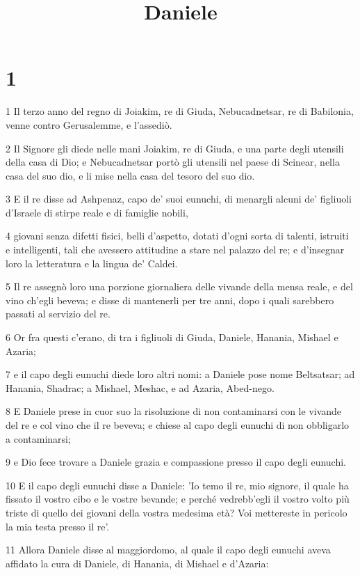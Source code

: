 

\title{Daniele}


\chapter{1}

\par 1 Il terzo anno del regno di Joiakim, re di Giuda, Nebucadnetsar, re di Babilonia, venne contro Gerusalemme, e l'assediò.
\par 2 Il Signore gli diede nelle mani Joiakim, re di Giuda, e una parte degli utensili della casa di Dio; e Nebucadnetsar portò gli utensili nel paese di Scinear, nella casa del suo dio, e li mise nella casa del tesoro del suo dio.
\par 3 E il re disse ad Ashpenaz, capo de' suoi eunuchi, di menargli alcuni de' figliuoli d'Israele di stirpe reale e di famiglie nobili,
\par 4 giovani senza difetti fisici, belli d'aspetto, dotati d'ogni sorta di talenti, istruiti e intelligenti, tali che avessero attitudine a stare nel palazzo del re; e d'insegnar loro la letteratura e la lingua de' Caldei.
\par 5 Il re assegnò loro una porzione giornaliera delle vivande della mensa reale, e del vino ch'egli beveva; e disse di mantenerli per tre anni, dopo i quali sarebbero passati al servizio del re.
\par 6 Or fra questi c'erano, di tra i figliuoli di Giuda, Daniele, Hanania, Mishael e Azaria;
\par 7 e il capo degli eunuchi diede loro altri nomi: a Daniele pose nome Beltsatsar; ad Hanania, Shadrac; a Mishael, Meshac, e ad Azaria, Abed-nego.
\par 8 E Daniele prese in cuor suo la risoluzione di non contaminarsi con le vivande del re e col vino che il re beveva; e chiese al capo degli eunuchi di non obbligarlo a contaminarsi;
\par 9 e Dio fece trovare a Daniele grazia e compassione presso il capo degli eunuchi.
\par 10 E il capo degli eunuchi disse a Daniele: 'Io temo il re, mio signore, il quale ha fissato il vostro cibo e le vostre bevande; e perché vedrebb'egli il vostro volto più triste di quello dei giovani della vostra medesima età? Voi mettereste in pericolo la mia testa presso il re'.
\par 11 Allora Daniele disse al maggiordomo, al quale il capo degli eunuchi aveva affidato la cura di Daniele, di Hanania, di Mishael e d'Azaria:
